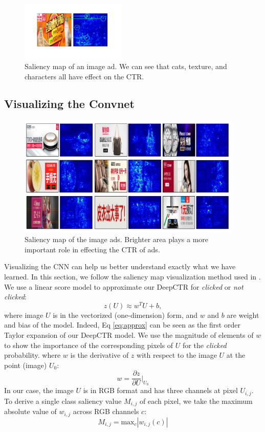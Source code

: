 \documentclass{sig-alternate-05-2015}
\begin{document}
\begin{figure}
	\centering
	\includegraphics[width=0.45\textwidth]{vis_compare}
	\caption{Saliency map of an image ad. We can see that cats, texture, and characters all have effect on the CTR. }
	\label{fig:vis_compare}
\end{figure}
\subsection{Visualizing the Convnet}
\begin{figure}
	\centering
	\includegraphics[width=0.95\textwidth]{vis}
	\caption{Saliency map of the image ads. Brighter area plays a more important role in effecting the CTR of ads.}
	\label{fig:vis}
\end{figure}
Visualizing the CNN can help us better understand exactly what we have learned. In this section, we follow the saliency map visualization method used in \cite{simonyan2013deep}. We use a linear score model to approximate our DeepCTR for \emph{clicked} or \emph{not clicked}:
\begin{equation}\label{eq:approx}
	z(U) \approx w^{T}U + b, 
\end{equation}
where image $U$ is in the vectorized (one-dimension) form, and $w$ and $b$ are weight and bias of the model. Indeed, Eq \ref{eq:approx} can be seen as the first order Taylor expansion of our DeepCTR model. We use the magnitude
of elements of $w$ to show the importance of the corresponding pixels of $U$ for the \emph{clicked} probability. where $w$ is the derivative of $z$ with respect to the image $U$ at the point (image) $U_{0}$:
\begin{equation}
	w  = \frac{\partial z}{\partial U} \Big|_{U_{0}}
\end{equation}
In our case, the image $U$ is in RGB format and has three channels at pixel $U_{i,j}$. To derive a single class saliency value $M_{i,j}$ of each pixel, we take the maximum  absolute value of $w_{i,j}$ across RGB channels $c$: 
\begin{equation}
	M_{i,j} = \text{max}_{c} |w_{i,j}(c)|
\end{equation}
\end{document}
